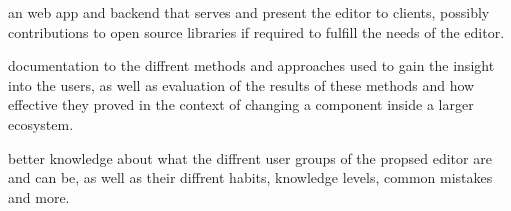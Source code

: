 \begin{description}[leftmargin=10em,style=nextline]
  \item[software] an web app and backend that serves and present the editor to clients, possibly contributions to open source libraries if required to fulfill the needs of the editor.
  \item[HCI discoveries] documentation to the diffrent methods and approaches used to gain the insight into the users,
  as well as evaluation of the results of these methods and how effective they proved in the context of changing a component inside a larger ecosystem.
  \item[user base knowledge] better knowledge about what the diffrent user groups of the propsed editor are and can be, as well as their diffrent habits, knowledge levels, common mistakes and more.
\end{description}

